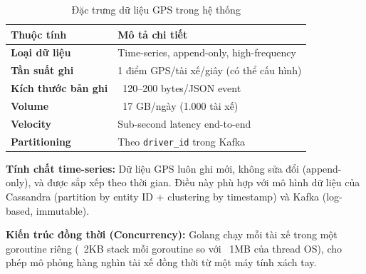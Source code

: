 \bigskip
\begin{table}[H]
\centering
\caption{Đặc trưng dữ liệu GPS trong hệ thống}
\label{tab:data-characteristics}
\begin{tabular}{|p{3.5cm}|p{6cm}|}
\hline
\textbf{Thuộc tính} & \textbf{Mô tả chi tiết} \\
\hline
\textbf{Loại dữ liệu} & Time-series, append-only, high-frequency \\
\hline
\textbf{Tần suất ghi} & 1 điểm GPS/tài xế/giây (có thể cấu hình) \\
\hline
\textbf{Kích thước bản ghi} & ~120–200 bytes/JSON event \\
\hline
\textbf{Volume} & ~17 GB/ngày (1.000 tài xế) \\
\hline
\textbf{Velocity} & Sub-second latency end-to-end \\
\hline
\textbf{Partitioning} & Theo \texttt{driver\_id} trong Kafka \\
\hline
\end{tabular}
\end{table}

\bigskip
\noindent
\textbf{Tính chất time-series:} Dữ liệu GPS luôn ghi mới, không sửa đổi (append-only), và được sắp xếp theo thời gian. Điều này phù hợp với mô hình dữ liệu của Cassandra (partition by entity ID + clustering by timestamp) và Kafka (log-based, immutable).

\bigskip
\noindent
\textbf{Kiến trúc đồng thời (Concurrency):} Golang chạy mỗi tài xế trong một goroutine riêng (~2KB stack mỗi goroutine so với ~1MB của thread OS), cho phép mô phỏng hàng nghìn tài xế đồng thời từ một máy tính xách tay.
